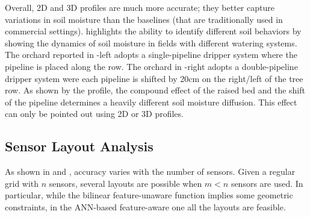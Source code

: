 Overall, 2D and 3D profiles are much more accurate; they better capture variations in soil moisture than the baselines (that are traditionally used in commercial settings).  highlights the ability to identify different soil behaviors by showing the dynamics of soil moisture in fields with different watering systems. The orchard reported in -left adopts a single-pipeline dripper system where the pipeline is placed along the row. 
The orchard in -right adopts a double-pipeline dripper system were each pipeline is shifted by 20cm on the right/left of the tree row.
As shown by the profile, the compound effect of the raised bed and the shift of the pipeline determines a heavily different soil moisture diffusion.
This effect can only be pointed out using 2D or 3D profiles.

\subsection{Sensor Layout Analysis}
\label{pluto-sec:sensors_disposal_evaluation}
As shown in  and , accuracy varies with the number of sensors. 
Given a regular grid with $n$ sensors, several layouts are possible when $m<n$ sensors are used.  
In particular, while the bilinear feature-unaware function implies some geometric constraints, in the ANN-based feature-aware one all the layouts are feasible.

